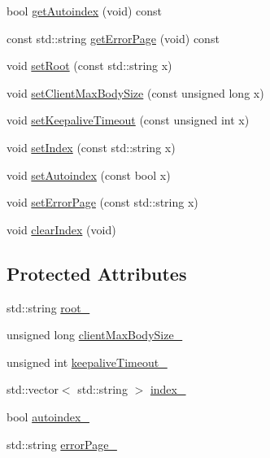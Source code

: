 \begin{DoxyCompactItemize}
bool \hyperlink{classft_1_1_base_directives_a4c11ed7ad76aeac228b029a2444de568}{get\+Autoindex} (void) const
\item 
const std\+::string \hyperlink{classft_1_1_base_directives_a3cb0c21f17781de392d5ee09d7190caf}{get\+Error\+Page} (void) const
\item 
void \hyperlink{classft_1_1_base_directives_a2a7990e309f7e38f2915dbbb0d2704cf}{set\+Root} (const std\+::string x)
\item 
void \hyperlink{classft_1_1_base_directives_a39bf4922f3236043c76beaffaa557a3b}{set\+Client\+Max\+Body\+Size} (const unsigned long x)
\item 
void \hyperlink{classft_1_1_base_directives_a0818b8529872ba9622329e2118d20c39}{set\+Keepalive\+Timeout} (const unsigned int x)
\item 
void \hyperlink{classft_1_1_base_directives_a6d3d8fd6eaaf71304128af6b3cee2a69}{set\+Index} (const std\+::string x)
\item 
void \hyperlink{classft_1_1_base_directives_ae7293c7bbf34e9bdc60c540dccd53342}{set\+Autoindex} (const bool x)
\item 
void \hyperlink{classft_1_1_base_directives_a505ecc88b3e1779583ad60cc243c7769}{set\+Error\+Page} (const std\+::string x)
\item 
void \hyperlink{classft_1_1_base_directives_a36d96dc74e650162c25a325813130ab2}{clear\+Index} (void)
\end{DoxyCompactItemize}
\subsection*{Protected Attributes}
\begin{DoxyCompactItemize}
\item 
std\+::string \hyperlink{classft_1_1_base_directives_abb1eaf0bba10b90172d6152e69457dc7}{root\+\_\+}
\item 
unsigned long \hyperlink{classft_1_1_base_directives_ad65c2594d2a90ca065d410dfd4066a19}{client\+Max\+Body\+Size\+\_\+}
\item 
unsigned int \hyperlink{classft_1_1_base_directives_aa1f5f394b428d0d18765a9b9e14e648f}{keepalive\+Timeout\+\_\+}
\item 
std\+::vector$<$ std\+::string $>$ \hyperlink{classft_1_1_base_directives_a6ba30626837f300201cd32c35d50aa49}{index\+\_\+}
\item 
bool \hyperlink{classft_1_1_base_directives_a4ebffbe32f50a462afa139c6f03c1a4f}{autoindex\+\_\+}
\item 
std\+::string \hyperlink{classft_1_1_base_directives_a5c0d388109f086503961de84fe3fce90}{error\+Page\+\_\+}
\end{DoxyCompactItemize}
